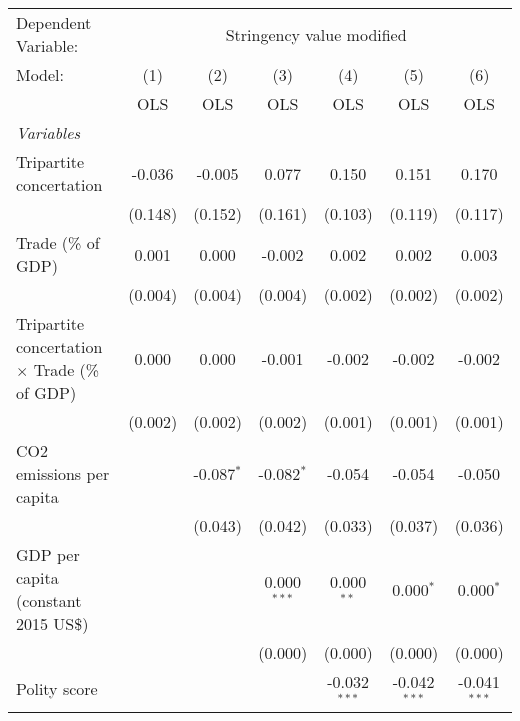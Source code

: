 
\begingroup
\centering
\begin{tabular}{lcccccc}
   \toprule
   Dependent Variable: & \multicolumn{6}{c}{Stringency value modified}\\
   Model:                                               & (1)     & (2)          & (3)           & (4)            & (5)            & (6)\\  
                                                        &  OLS    & OLS          & OLS           & OLS            & OLS            & OLS\\  
   \midrule
   \emph{Variables}\\
   Tripartite concertation                              & -0.036  & -0.005       & 0.077         & 0.150          & 0.151          & 0.170\\   
                                                        & (0.148) & (0.152)      & (0.161)       & (0.103)        & (0.119)        & (0.117)\\   
   Trade (\% of GDP)                                    & 0.001   & 0.000        & -0.002        & 0.002          & 0.002          & 0.003\\   
                                                        & (0.004) & (0.004)      & (0.004)       & (0.002)        & (0.002)        & (0.002)\\   
   Tripartite concertation $\times$ Trade (\% of GDP)   & 0.000   & 0.000        & -0.001        & -0.002         & -0.002         & -0.002\\   
                                                        & (0.002) & (0.002)      & (0.002)       & (0.001)        & (0.001)        & (0.001)\\   
   CO2 emissions per capita                             &         & -0.087$^{*}$ & -0.082$^{*}$  & -0.054         & -0.054         & -0.050\\   
                                                        &         & (0.043)      & (0.042)       & (0.033)        & (0.037)        & (0.036)\\   
   GDP per capita (constant 2015 US\$)                  &         &              & 0.000$^{***}$ & 0.000$^{**}$   & 0.000$^{*}$    & 0.000$^{*}$\\   
                                                        &         &              & (0.000)       & (0.000)        & (0.000)        & (0.000)\\   
   Polity score                                         &         &              &               & -0.032$^{***}$ & -0.042$^{***}$ & -0.041$^{***}$\\   

\end{tabular}
